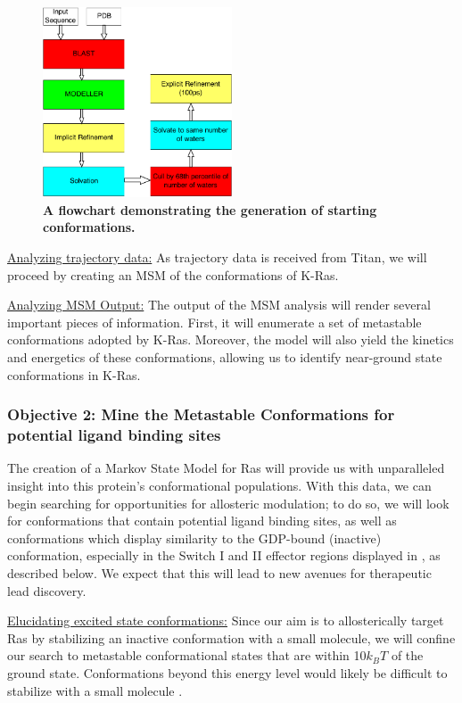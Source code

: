 \documentclass[12pt]{article}
\begin{document}
  
  \begin{figure}[H]
    \centering
    \includegraphics[width=0.5\textwidth]{msmseeder-diagram.png}
  \caption{\textbf{A flowchart demonstrating the generation of starting conformations.}}
  \label{msmseeder}
  \end{figure}
  

  
  \underline{Analyzing trajectory data:} As trajectory data is received from Titan, we will proceed by creating an MSM of the conformations of K-Ras.  
  
  \underline{Analyzing MSM Output:} The output of the MSM analysis will render several important pieces of information. First, it will enumerate a set of metastable conformations adopted by K-Ras. Moreover, the model will also yield the kinetics and energetics of these conformations, allowing us to identify near-ground state conformations in K-Ras.
  
  \subsubsection*{Objective 2: Mine the Metastable Conformations for potential ligand binding sites}
  The creation of a Markov State Model for Ras will provide us with unparalleled insight into this protein's conformational populations. With this data, we can begin searching for opportunities for allosteric modulation; to do so, we will look for conformations that contain potential ligand binding sites, as well as conformations which display similarity to the GDP-bound (inactive) conformation, especially in the Switch I and II effector regions displayed in , as described below. We expect that this will lead to new avenues for therapeutic lead discovery.
  
  \underline{Elucidating excited state conformations:} Since our aim is to allosterically target Ras by stabilizing an inactive conformation with a small molecule, we will confine our search to metastable conformational states that are within 10$k_BT$ of the ground state. Conformations beyond this energy level would likely be difficult to stabilize with a small molecule \cite{kuntz1999}.
  
\end{document}
